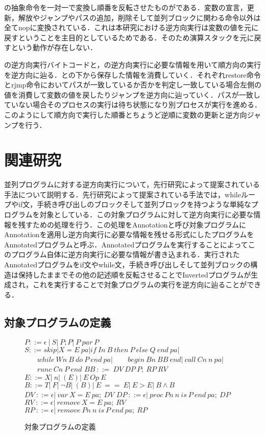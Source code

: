 \documentclass[submit,PRO]{ipsj}
\begin{document}
の抽象命令を一対一で変換し順番を反転させたものがである．変数の宣言，更新，解放やジャンプやパスの追加，削除そして並列ブロックに関わる命令以外は全てnopに変換されている．これは本研究における逆方向実行は変数の値を元に戻すということを主目的としているためである．そのため演算スタックを元に戻すという動作が存在しない．

の逆方向実行バイトコードと，の逆方向実行に必要な情報を用いて順方向の実行を逆方向に辿る．との下から保存した情報を消費していく．それぞれrestore命令とrjmp命令においてパスが一致しているか否かを判定し一致している場合左側の値を消費して変数の値を戻したりジャンプを逆方向に辿っていく．パスが一致していない場合そのプロセスの実行は待ち状態になり別プロセスが実行を進める．このようにして順方向で実行した順番とちょうど逆順に変数の更新と逆方向ジャンプを行う．



\section{関連研究}

並列プログラムに対する逆方向実行について，先行研究\cite{HIY18,H20}によって提案されている手法について説明する．先行研究\cite{HIY18,H20}によって提案されている手法では，whileループやif文，手続き呼び出しのブロックそして並列ブロックを持つような単純なプログラムを対象としている．この対象プログラムに対して逆方向実行に必要な情報を残すための処理を行う．この処理をAnnotationと呼び対象プログラムにAnnotationを適用し逆方向実行に必要な情報を残せる形式にしたプログラムをAnnotatedプログラムと呼ぶ．Annotatedプログラムを実行することによってこのプログラム自体に逆方向実行に必要な情報が書き込まれる．実行されたAnnotatedプログラムをif文やwhile文，手続き呼び出しそして並列ブロックの構造は保持したままでその他の記述順を反転させることでInvertedプログラムが生成され，これを実行することで対象プログラムの実行を逆方向に辿ることができる．

\subsection{対象プログラムの定義}

\begin{figure}[tb]
\vbox{
\hbox{$P ::= \epsilon\ |\ S |\ P;P |\ P\ par\ P$}
\hbox{$S ::= skip | X = E\ pa | if\ In\ B\ then\ P\ else\ Q\ end\ pa|$}
\hbox{$\ \ \ \ \ \ \ \ while\ Wn\ B\ do\ P\ end\ pa | $}
\hbox{$\ \ \ \ \ \ \ \ begin\ Bn\ BB\ end |\ call\ Cn\ n\ pa|$}
\hbox{$\ \ \ \ \ \ \ \ runc\ Cn\ P\ end$}
\hbox{$BB\ ::=\ DV\ DP\ P;\ RP\ RV$}
\hbox{$E::=X |\ n |\ (E)|\ E\ Op\ E$}
\hbox{$B::=T|\ F|\ \lnot B |\ (B)|\ E\ ==\ E |\ E > E|\ B \land B$}
\hbox{$DV\ ::= \epsilon |\ var\ X=E\ pa;\ DV$}
\hbox{$DP\ ::= \epsilon |\ proc\ Pn\ n\ is\ P\ end\ pa;\ DP$}
\hbox{$RV\ ::=\epsilon |\  remove\ X=E\ pa;\ RV$}
\hbox{$RP\ ::= \epsilon |\ remove\ Pn\ n\ is\ P\ end\ pa;\ RP$}
}
\centerline{}
\caption{対象プログラムの定義}
\label{fig:Hdef}
\end{figure}
\end{document}
